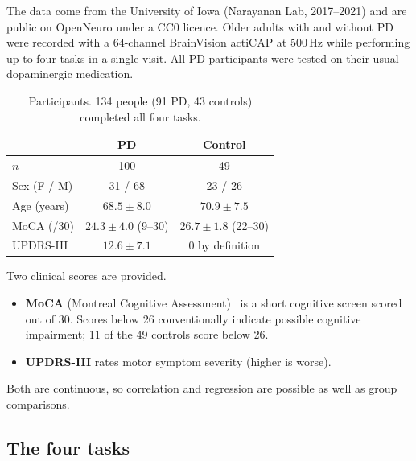 \documentclass[11pt,a4paper]{article}
\begin{document}
The data come from the University of Iowa (Narayanan Lab, 2017--2021) and are public on OpenNeuro under a CC0 licence. Older adults with and without PD were recorded with a 64-channel BrainVision actiCAP at 500\,Hz while performing up to four tasks in a single visit. All PD participants were tested on their usual dopaminergic medication.

\begin{table}[h]
\centering
\begin{tabular}{lcc}
\toprule
 & PD & Control \\
\midrule
$n$ & 100 & 49 \\
Sex (F / M) & 31 / 68 & 23 / 26 \\
Age (years) & $68.5 \pm 8.0$ & $70.9 \pm 7.5$ \\
MoCA (/30) & $24.3 \pm 4.0$ (9--30) & $26.7 \pm 1.8$ (22--30) \\
UPDRS-III & $12.6 \pm 7.1$ & 0 by definition \\
\bottomrule
\end{tabular}
\caption{Participants. 134 people (91 PD, 43 controls) completed all four tasks.}
\end{table}

\noindent Two clinical scores are provided.
\begin{itemize}
  \item \textbf{MoCA} (Montreal Cognitive Assessment)~\cite{nasreddine2005} is a short cognitive screen scored out of 30. Scores below 26 conventionally indicate possible cognitive impairment; 11 of the 49 controls score below 26.
  \item \textbf{UPDRS-III} rates motor symptom severity (higher is worse).
\end{itemize}
Both are continuous, so correlation and regression are possible as well as group comparisons.

\subsection{The four tasks}
\end{document}
